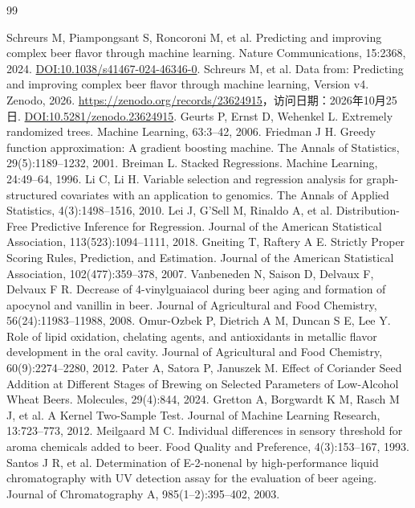 \documentclass{mathorcup-journal}
\begin{document}
\begin{thebibliography}{99}\raggedright
{} Schreurs M, Piampongsant S, Roncoroni M, et al. Predicting and improving complex beer flavor through machine learning. Nature Communications, 15:2368, 2024. \href{https://doi.org/10.1038/s41467-024-46346-0}{DOI:10.1038/s41467-024-46346-0}.
 Schreurs M, et al. Data from: Predicting and improving complex beer flavor through machine learning, Version v4. Zenodo, 2026. \url{https://zenodo.org/records/23624915}，访问日期：2026年10月25日. \href{https://doi.org/10.5281/zenodo.23624915}{DOI:10.5281/zenodo.23624915}.
 Geurts P, Ernst D, Wehenkel L. Extremely randomized trees. Machine Learning, 63:3–42, 2006.
 Friedman J H. Greedy function approximation: A gradient boosting machine. The Annals of Statistics, 29(5):1189–1232, 2001.
 Breiman L. Stacked Regressions. Machine Learning, 24:49–64, 1996.
 Li C, Li H. Variable selection and regression analysis for graph-structured covariates with an application to genomics. The Annals of Applied Statistics, 4(3):1498–1516, 2010.
 Lei J, G'Sell M, Rinaldo A, et al. Distribution-Free Predictive Inference for Regression. Journal of the American Statistical Association, 113(523):1094–1111, 2018.
 Gneiting T, Raftery A E. Strictly Proper Scoring Rules, Prediction, and Estimation. Journal of the American Statistical Association, 102(477):359–378, 2007.
 Vanbeneden N, Saison D, Delvaux F, Delvaux F R. Decrease of 4-vinylguaiacol during beer aging and formation of apocynol and vanillin in beer. Journal of Agricultural and Food Chemistry, 56(24):11983–11988, 2008.
 Omur-Ozbek P, Dietrich A M, Duncan S E, Lee Y. Role of lipid oxidation, chelating agents, and antioxidants in metallic flavor development in the oral cavity. Journal of Agricultural and Food Chemistry, 60(9):2274–2280, 2012.
 Pater A, Satora P, Januszek M. Effect of Coriander Seed Addition at Different Stages of Brewing on Selected Parameters of Low-Alcohol Wheat Beers. Molecules, 29(4):844, 2024.
 Gretton A, Borgwardt K M, Rasch M J, et al. A Kernel Two-Sample Test. Journal of Machine Learning Research, 13:723–773, 2012.
 Meilgaard M C. Individual differences in sensory threshold for aroma chemicals added to beer. Food Quality and Preference, 4(3):153–167, 1993.
 Santos J R, et al. Determination of E-2-nonenal by high-performance liquid chromatography with UV detection assay for the evaluation of beer ageing. Journal of Chromatography A, 985(1–2):395–402, 2003.
\end{thebibliography}
\appendix
\end{document}
